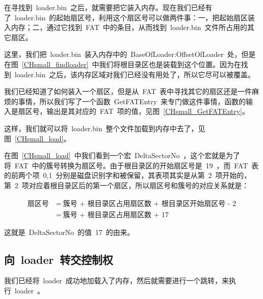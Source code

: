 在寻找到~loader.bin~之后，就需要把它装入内存。现在我们已经有了~loader.bin~的起始扇区号，利用这个扇区号可以做两件事：一，把起始扇区装入内存；二，通过它找到~FAT~中的条目，从而找到~loader.bin~文件所占用的其它扇区。

这里，我们把~loader.bin~装入内存中的~BaseOfLoader:OffsetOfLoader~处，但是在图~\ref{CHsmall_findloader}~中我们将根目录区也是装载到这个位置。因为在找到~loader.bin~之后，该内存区域对我们已经没有用处了，所以它尽可以被覆盖。

我们已经知道了如何装入一个扇区，但是从~FAT~表中寻找其它的扇区还是一件麻烦的事情，所以我们写了一个函数~GetFATEntry~来专门做这件事情，函数的输入是扇区号，输出是其对应的~FAT~项的值，见图~\ref{CHsmall_GetFATEntry}。

\label{CHsmall_GetFATEntry}

这样，我们就可以将~loader.bin~整个文件加载到内存中去了，见图~\ref{CHsmall_load}。

\label{CHsmall_load}

在图~\ref{CHsmall_load}~中我们看到一个宏~DeltaSectorNo~，这个宏就是为了将~FAT~中的簇号转换为扇区号。由于根目录区的开始扇区号是~19~，而~FAT~表的前两个项~0,1~分别是磁盘识别字和被保留，其表项其实是从第~2~项开始的，第~2~项对应着根目录区后的第一个扇区，所以扇区号和簇号的对应关系就是：

\begin{align*}
\mbox{扇区号}~&=~\mbox{簇号~+~根目录区占用扇区数~+~根目录区开始扇区号~-~2}\\
 &=~\mbox{簇号~+~根目录区占用扇区数~+~17}
\end{align*}

这就是~DeltaSectorNo~的值~17~的由来。

\subsection{向~loader~转交控制权}

我们已经将~loader~成功地加载入了内存，然后就需要进行一个跳转，来执行~loader~。

\label{CHsmall_jump}

